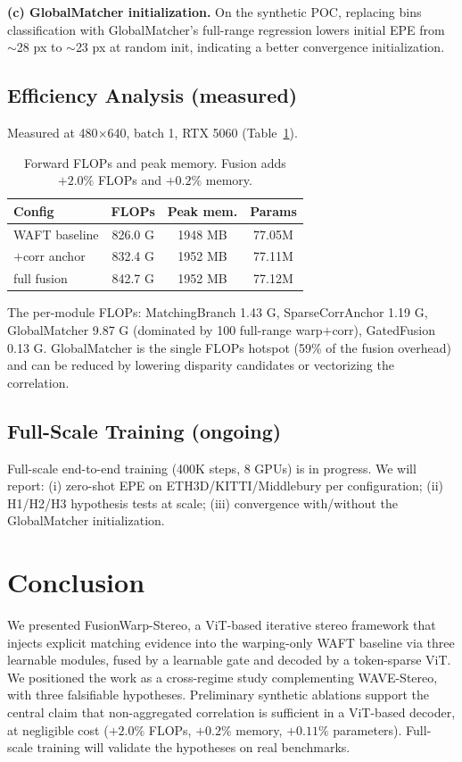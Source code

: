 \documentclass[conference]{IEEEtran}
\begin{document}
\noindent\textbf{(c) GlobalMatcher initialization.} On the synthetic POC, replacing bins classification with GlobalMatcher's full-range regression lowers initial EPE from $\sim$28 px to $\sim$23 px at random init, indicating a better convergence initialization.

\subsection{Efficiency Analysis (measured)}
Measured at 480$\times$640, batch 1, RTX 5060 (Table~\ref{tab:eff}).

\begin{table}[t]
\centering
\caption{Forward FLOPs and peak memory. Fusion adds $+2.0\%$ FLOPs and $+0.2\%$ memory.}
\label{tab:eff}
\begin{tabular}{@{}lccc@{}}
\toprule
Config & FLOPs & Peak mem. & Params \\
\midrule
WAFT baseline & 826.0 G & 1948 MB & 77.05M \\
$+$corr anchor & 832.4 G & 1952 MB & 77.11M \\
full fusion & 842.7 G & 1952 MB & 77.12M \\
\bottomrule
\end{tabular}
\end{table}

The per-module FLOPs: MatchingBranch 1.43 G, SparseCorrAnchor 1.19 G, GlobalMatcher 9.87 G (dominated by 100 full-range warp$+$corr), GatedFusion 0.13 G. GlobalMatcher is the single FLOPs hotspot (59\% of the fusion overhead) and can be reduced by lowering disparity candidates or vectorizing the correlation.

\subsection{Full-Scale Training (ongoing)}
Full-scale end-to-end training (400K steps, 8 GPUs) is in progress. We will report: (i) zero-shot EPE on ETH3D/KITTI/Middlebury per configuration; (ii) H1/H2/H3 hypothesis tests at scale; (iii) convergence with/without the GlobalMatcher initialization.

\section{Conclusion}
We presented FusionWarp-Stereo, a ViT-based iterative stereo framework that injects explicit matching evidence into the warping-only WAFT baseline via three learnable modules, fused by a learnable gate and decoded by a token-sparse ViT. We positioned the work as a cross-regime study complementing WAVE-Stereo, with three falsifiable hypotheses. Preliminary synthetic ablations support the central claim that non-aggregated correlation is sufficient in a ViT-based decoder, at negligible cost ($+2.0\%$ FLOPs, $+0.2\%$ memory, $+0.11\%$ parameters). Full-scale training will validate the hypotheses on real benchmarks.
\end{document}
